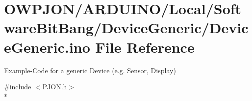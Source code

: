 \hypertarget{ARDUINO_2Local_2SoftwareBitBang_2DeviceGeneric_2DeviceGeneric_8ino}{\section{O\-W\-P\-J\-O\-N/\-A\-R\-D\-U\-I\-N\-O/\-Local/\-Software\-Bit\-Bang/\-Device\-Generic/\-Device\-Generic.ino File Reference}
\label{ARDUINO_2Local_2SoftwareBitBang_2DeviceGeneric_2DeviceGeneric_8ino}
}


Example-\/\-Code for a generic Device (e.\-g. Sensor, Display)  


{\ttfamily \#include $<$P\-J\-O\-N.\-h$>$}\\*
